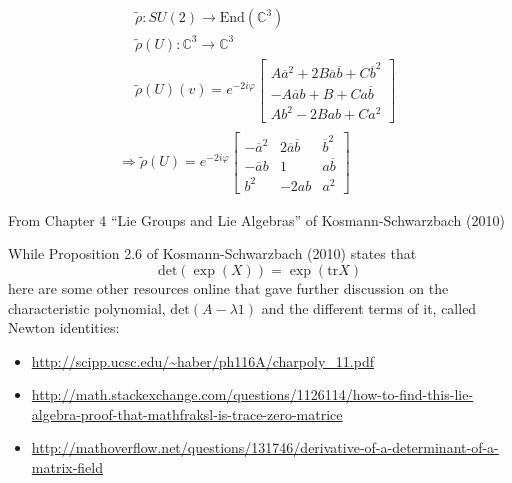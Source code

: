 \documentclass[10pt]{amsart}
\begin{document}
\begin{multicols*}{2}
\[
\begin{gathered}
  \begin{aligned}
    & \widetilde{\rho} : SU(2) \to \text{End}(\mathbb{C}^3) \\
    & \widetilde{\rho}(U) : \mathbb{C}^3 \to \mathbb{C}^3 \\
    & \widetilde{\rho}(U)(v) = e^{-2i\varphi} \left[ \begin{matrix} A\overline{a}^2 + 2B\overline{a}\overline{b} + C \overline{b}^2 \\ 
        -A\overline{a}b + B + Ca\overline{b} \\
        Ab^2 - 2Bab + Ca^2 \end{matrix} \right]
\end{aligned} \\
  \Longrightarrow \widetilde{\rho}(U) = e^{-2i \varphi} \left[ \begin{matrix} -\overline{a}^2 & 2\overline{a}\overline{b} & \overline{b}^2 \\
      -\overline{a}b & 1 & a\overline{b} \\
      b^2 & - 2ab & a^2 \end{matrix} \right]
\end{gathered}
\]

From Chapter 4 ``Lie Groups and Lie Algebras'' of Kosmann-Schwarzbach (2010) \cite{YKosmann-Schwarzbach2010}

While Proposition 2.6 of Kosmann-Schwarzbach (2010) \cite{YKosmann-Schwarzbach2010} states that
\[
\text{det}(\exp(X)) = \exp{ (\text{tr}{X} ) }
\]
here are some other resources online that gave further discussion on the characteristic polynomial, $\text{det}(A-\lambda 1)$ and the different terms of it, called Newton identities:
\begin{itemize}
\item \url{http://scipp.ucsc.edu/~haber/ph116A/charpoly_11.pdf}
\item \url{http://math.stackexchange.com/questions/1126114/how-to-find-this-lie-algebra-proof-that-mathfraksl-is-trace-zero-matrice}
\item \url{http://mathoverflow.net/questions/131746/derivative-of-a-determinant-of-a-matrix-field}
\end{itemize}


\end{multicols*}
\end{document}
